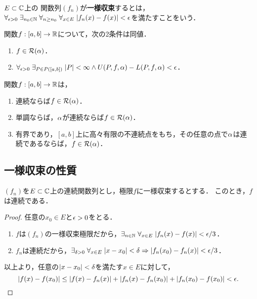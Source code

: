 \documentclass[uplatex, dvipdfmx]{jsreport}
\begin{document}
\begin{definition}
    $E\subset\mathbb{C}$上の
    関数列$(f_n)$が\textbf{一様収束}するとは，$\forall_{\epsilon>0}\;\exists_{n_0\in\mathbb{N}}\;\forall_{n\ge n_0}\;\forall_{x\in E}\;\lvert f_n(x)-f(x)\rvert<\epsilon$を満たすことをいう．
\end{definition}

\begin{theorem}[可積分性の特徴付け]
    関数$f:[a,b]\to\mathbb{R}$について，次の2条件は同値．
    \begin{enumerate}
        \item $f\in\mathcal{R}(\alpha)$．
        \item $\forall_{\epsilon>0}\;\exists_{P\in P([a,b])}\;\lvert P\rvert<\infty\land U(P,f,\alpha)-L(P,f,\alpha)<\epsilon$．
    \end{enumerate}
\end{theorem}

\begin{theorem}[可積分条件]\mbox{}
    関数$f:[a,b]\to\mathbb{R}$は，
    \begin{enumerate}
        \item 連続ならば$f\in\mathcal{R}(\alpha)$．
        \item 単調ならば，$\alpha$が連続ならば$f\in\mathcal{R}(\alpha)$．
        \item 有界であり，$[a,b]$上に高々有限の不連続点をもち，その任意の点で$\alpha$は連続であるならば，$f\in\mathcal{R}(\alpha)$．
    \end{enumerate}
\end{theorem}



\subsection{一様収束の性質}

\begin{theorem}[一様収束は連続性を保つ]
    $(f_n)$を$E\subset\mathbb{C}$上の連続関数列とし，極限$f$に一様収束するとする．
    このとき，$f$は連続である．
\end{theorem}
\begin{proof}
    任意の$x_0\in E$と$\epsilon>0$をとる．
    \begin{enumerate}
        \item $f$は$(f_n)$の一様収束極限だから，$\exists_{n\in\mathbb{N}}\;\forall_{x\in E}\;\lvert f_n(x)-f(x)\rvert<\epsilon/3$．
        \item $f_n$は連続だから，$\exists_{\delta>0}\;\forall_{x\in E}\;\lvert x-x_0\rvert<\delta\Rightarrow\lvert f_n(x_0)-f_n(x)\rvert<\epsilon/3$．
    \end{enumerate}
    以上より，任意の$\lvert x-x_0\rvert<\delta$を満たす$x\in E$に対して，
    \[\lvert f(x)-f(x_0)\rvert\le\lvert f(x)-f_n(x)\rvert+\lvert f_n(x)-f_n(x_0)\rvert+\lvert f_n(x_0)-f(x_0)\rvert<\epsilon.\]
\end{proof}
\end{document}
